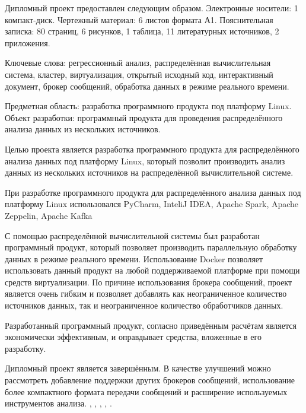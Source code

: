 \label{sec:ref}

Дипломный проект предоставлен следующим образом. Электронные носители: 1
компакт-диск. Чертежный материал: 6 листов формата А1. Пояснительная записка:
80 страниц, 6 рисунков, 1 таблица, 11 литературных источников, 2 приложения.

Ключевые слова: регрессионный анализ, распределённая вычислительная система, кластер, виртуализация, открытый исходный код, интерактивный документ, брокер сообщений, обработка данных в режиме реального времени.

Предметная область: разработка программного продукта под платформу Linux.
Объект разработки: программный продукта для проведения распределённого анализа данных из нескольких источников.

Целью проекта является разработка программного продукта для распределённого анализа данных под платформу Linux, который позволит производить анализ данных из нескольких источников на распределённой вычислительной системе.

При разработке программного продукта для распределённого анализа данных под платформу Linux использовался PyCharm, InteliJ IDEA, Apache Spark, Apache Zeppelin, Apache Kafka

С помощью распределённой вычислительной системы был разработан программный продукт, который позволяет производить параллельную обработку данных в режиме реального времени.
Использование Docker позволяет использовать данный продукт на любой поддерживаемой платформе при помощи средств виртуализации.
По причине использования брокера сообщений, проект является очень гибким и позволяет добавлять как неограниченное количество источников данных, так и неограниченное количество обработчиков данных.

Разработанный программный продукт, согласно приведённым расчётам является экономически эффективным, и оправдывает средства, вложенные в его разработку.

Дипломный проект является завершённым. В качестве улучшений можно рассмотреть добавление поддержки других брокеров сообщений, использование более компактного формата передачи сообщений и расширение используемых инструментов анализа.
\insertNumPagesText ,
\insertNumFiguresText , \insertNumTablesText ,
\insertNumBibElementsText ,
\insertNumAnnexesText .

\newpage
